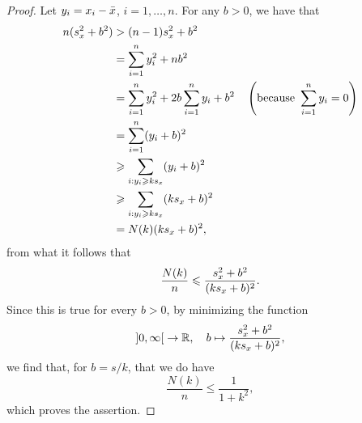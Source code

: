 \begin{proof}
  Let \(y_{i}=x_{i}-\bar{x}\), \(i=1,\ldots,n\). For any \(b>0\), we have
  that
  \begin{align*}
    n(s_{x}^{2}+b^{2})
    &>
    (n-1)s_{x}^{2}+b^{2}
    \\
    &=
    \sum_{i=1}^{n}y_{i}^{2}+nb^{2}
    \\
    &=
    \sum_{i=1}^{n}y_{i}^{2}+2b\sum_{i=1}^{n}y_{i}+b^{2}\quad\left(\textup{because}\,\,\sum_{i=1}^{n}y_{i}=0\right)
    \\
    &=
    \sum_{i=1}^{n}(y_{i}+b)^{2}
    \\
    &\geqslant
    \sum_{i:y_{i}\geqslant{ks_{x}}}(y_{i}+b)^{2}
    \\
    &\geqslant
    \sum_{i:y_{i}\geqslant{ks_{x}}}(ks_{x}+b)^{2}
    \\
    &=
    N(k)(ks_{x}+b)^{2},
  \end{align*}
  from what it follows that
  \[
    \frac{N(k)}{n}
    \leqslant
    \frac{s_{x}^{2}+b^{2}}{(ks_{x}+b)^{2}}.
  \]
  Since this is true for every \(b>0\), by minimizing the function
  \[
    \ointerval{0}{\infty}\to\reals,
    \quad
    b\mapsto{\frac{\samplevariance{x}+b^{2}}{(k\samplestandarddeviation{x}+b)^{2}}},
  \]
  we find that, for \(b=s/k\), that we do have
  \[
    \frac{N(k)}{n}\leqslant{\frac{1}{1+k^{2}}},
  \]
  which proves the assertion.
\end{proof}
